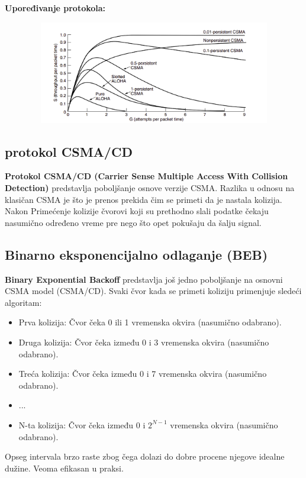 \documentclass[a4paper]{article}
\begin{document}
        \textbf{Upoređivanje protokola:}
        \begin{figure}[H]
            \begin{center}
                \includegraphics[width=120mm,height=45mm]{Slike/broadcast1.png}
            \end{center}
        \end{figure}
    \subsection{protokol CSMA/CD}
        \textbf{Protokol CSMA/CD (Carrier Sense Multiple Access With Collision Detection)} predstavlja 
        poboljšanje osnove verzije CSMA. Razlika u odnosu na klasičan CSMA je što je 
        prenos prekida čim se primeti da je nastala kolizija. Nakon Primećenje kolizije čvorovi
        koji su prethodno slali podatke čekaju nasumično određeno vreme pre nego što opet
        pokušaju da šalju signal. 
    
    \subsection{Binarno eksponencijalno odlaganje (BEB)}
        \textbf{Binary Exponential Backoff} predstavlja još jedno poboljšanje na osnovni CSMA model (CSMA/CD). 
        Svaki čvor kada se primeti koliziju primenjuje sledeći algoritam:
        \begin{itemize}
            \item Prva kolizija: Čvor čeka 0 ili 1 vremenska okvira (nasumično odabrano).
            \item Druga kolizija: Čvor čeka između 0 i 3 vremenska okvira (nasumično odabrano).
            \item Treća kolizija: Čvor čeka između 0 i 7 vremenska okvira (nasumično odabrano).
            \item ...
            \item N-ta kolizija: Čvor čeka između 0 i $2^{N-1}$ vremenska okvira (nasumično odabrano).
        \end{itemize}
        Opseg intervala brzo raste zbog čega dolazi do dobre procene njegove idealne dužine. Veoma
        efikasan u praksi.
\end{document}

